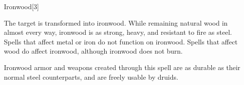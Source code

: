 \begin{spellsection}{Ironwood}[3]
    \begin{spellheader}
    \end{spellheader}
    \begin{spellcontent}
        \begin{spelltargetinginfo}
        \end{spelltargetinginfo}
        \begin{spelleffects}
            \spelleffect The target is transformed into ironwood. While remaining natural wood in almost every way, ironwood is as strong, heavy, and resistant to fire as steel. Spells that affect metal or iron do not function on ironwood. Spells that affect wood do affect ironwood, although ironwood does not burn.
        \end{spelleffects}
    \end{spellcontent}
    \begin{spellfooter}
        \spellnotes Ironwood armor and weapons created through this spell are as durable as their normal steel counterparts, and are freely usable by druids.
    \end{spellfooter}
    \begin{spellaugments}
    \end{spellaugments}
\end{spellsection}

